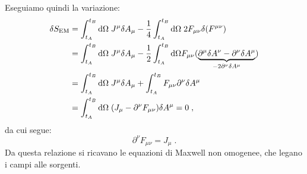 \documentclass[12pt,a4paper]{report}
\theoremstyle{definition}
\newcommand{\diff}[1][]{\mathrm{d}#1}
\begin{document}
Eseguiamo quindi la variazione:
\begin{align}
\delta S_{\mathrm{EM}} &= \int_{t_A}^{t_B}\diff{\Omega}\;J^{\mu}\delta A_{\mu}-\frac{1}{4}\int_{t_A}^{t_B}\diff{\Omega}\; 2F_{\mu\nu}\delta(F^{\mu\nu}) \notag \\
&= \int_{t_A}^{t_B}\diff{\Omega}\; J^{\mu}\delta A_{\mu}-\frac{1}{2}\int_{t_A}^{t_B}\diff{\Omega}F_{\mu\nu}(\underbrace{\partial^{\mu}\delta A^{\nu}-\partial^{\nu}\delta A^{\mu}}_{-2\partial^{\nu}\delta A^{\mu}}) \notag \\
&= \int_{t_A}^{t_B}\diff{\Omega}\; J^{\mu}\delta A_{\mu}+\int_{t_A}^{t_B} F_{\mu\nu}\partial^{\nu}\delta A^{\mu} \notag \\
&= \int_{t_A}^{t_B}\diff{\Omega}\; (J_{\mu}-\partial^{\nu}F_{\mu\nu})\delta A^{\mu}=0\;,
\end{align}
da cui segue:
\begin{equation}
\partial^{\nu}F_{\mu\nu}=J_{\mu}\;.
\end{equation}
Da questa relazione si ricavano le equazioni di Maxwell non omogenee, che legano i campi alle sorgenti.
\end{document}
